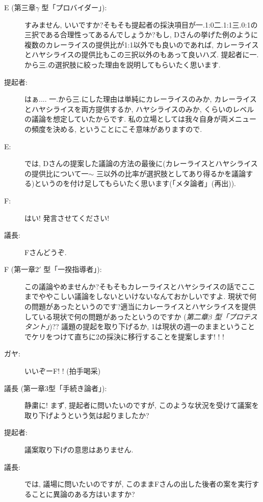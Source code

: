 \documentclass[10pt,b5jsbook,dvips,dvipdfmx,openany]{jsbook}
\theoremstyle{definition}
\begin{document}
		\begin{description}

		\item[E (第三章$ \gamma $ 型「プロバイダー」): ]すみません, いいですか?そもそも提起者の採決項目が一.1:0二.1:1三.0:1の三択である合理性ってあるんでしょうか?もし, Dさんの挙げた例のように複数のカレーライスの提供比が1:1以外でも良いのであれば, カレーライスとハヤシライスの提供比もこの三択以外のもあって良いハズ. 提起者に一.から三.の選択肢に絞った理由を説明してもらいたく思います.

		\item[提起者: ]はぁ.... 一.から三.にした理由は単純にカレーライスのみか, カレーライスとハヤシライスを両方提供するか, ハヤシライスのみか, くらいのレベルの議論を想定していたからです. 私の立場としては我々自身が両メニューの頻度を決める, ということにこそ意味がありますので.

		\item[E: ]では, Dさんの提案した議論の方法の最後に(カレーライスとハヤシライスの提供比について一$ \sim $ 三以外の比率が選択肢としてあり得るかを議論する)というのを付け足してもらいたく思います(「メタ論者」(再出)).

		\item[F: ]はい! 発言させてください!

		\item[議長: ]Fさんどうぞ.

		\item[F (第一章$2'$ 型「一揆指導者」): ]この議論やめませんか?そもそもカレーライスとハヤシライスの話でここまでややこしい議論をしないといけないなんておかしいですよ. 現状で何の問題があったというのです?適当にカレーライスとハヤシライスを提供している現状で何の問題があったというのですか (\emph{第二章$ \beta $ 型「プロテスタント」})?? 議題の提起を取り下げるか, 1は現状の週一のままということでケリをつけて直ちに2の採決に移行することを提案します! ! !

		\item[ガヤ: ]いいぞーF! !  (拍手喝采)

		\item[議長 (第一章3型「手続き論者」): ]静粛に! まず, 提起者に問いたいのですが, このような状況を受けて議案を取り下げようという気は起りましたか?

		\item[提起者: ]議案取り下げの意思はありません.

		\item[議長: ]では, 議場に問いたいのですが, このままFさんの出した後者の案を実行することに異論のある方はいますか?


\end{description}
\end{document}
